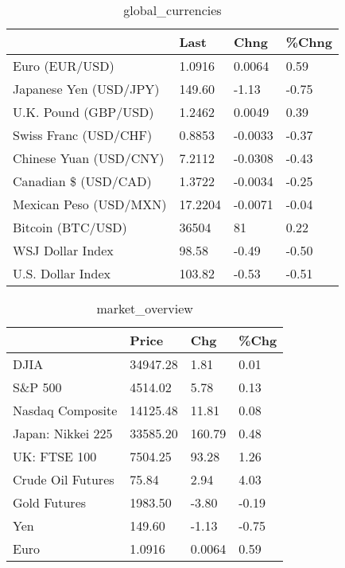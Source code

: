 \documentclass{article}%
\begin{document}
%


\begin{table}[htbp]%
\caption{global\_currencies}%
\centering%
\begin{adjustbox}{width=1\textwidth}%
\begin{tabular}{llll}
\toprule
                       &    Last &    Chng & \%Chng \\
\midrule
        Euro (EUR/USD) &  1.0916 &  0.0064 &  0.59 \\
Japanese Yen (USD/JPY) &  149.60 &   -1.13 & -0.75 \\
  U.K. Pound (GBP/USD) &  1.2462 &  0.0049 &  0.39 \\
 Swiss Franc (USD/CHF) &  0.8853 & -0.0033 & -0.37 \\
Chinese Yuan (USD/CNY) &  7.2112 & -0.0308 & -0.43 \\
  Canadian \$ (USD/CAD) &  1.3722 & -0.0034 & -0.25 \\
Mexican Peso (USD/MXN) & 17.2204 & -0.0071 & -0.04 \\
     Bitcoin (BTC/USD) &   36504 &      81 &  0.22 \\
      WSJ Dollar Index &   98.58 &   -0.49 & -0.50 \\
     U.S. Dollar Index &  103.82 &   -0.53 & -0.51 \\
\bottomrule
\end{tabular}
%
\end{adjustbox}%
\end{table}

%


\begin{table}[htbp]%
\caption{market\_overview}%
\centering%
\begin{adjustbox}{width=1\textwidth}%
\begin{tabular}{llll}
\toprule
                  &    Price &    Chg &  \%Chg \\
\midrule
             DJIA & 34947.28 &   1.81 &  0.01 \\
          S\&P 500 &  4514.02 &   5.78 &  0.13 \\
 Nasdaq Composite & 14125.48 &  11.81 &  0.08 \\
Japan: Nikkei 225 & 33585.20 & 160.79 &  0.48 \\
     UK: FTSE 100 &  7504.25 &  93.28 &  1.26 \\
Crude Oil Futures &    75.84 &   2.94 &  4.03 \\
     Gold Futures &  1983.50 &  -3.80 & -0.19 \\
              Yen &   149.60 &  -1.13 & -0.75 \\
             Euro &   1.0916 & 0.0064 &  0.59 \\
\bottomrule
\end{tabular}
%
\end{adjustbox}%
\end{table}

%
\end{document}

